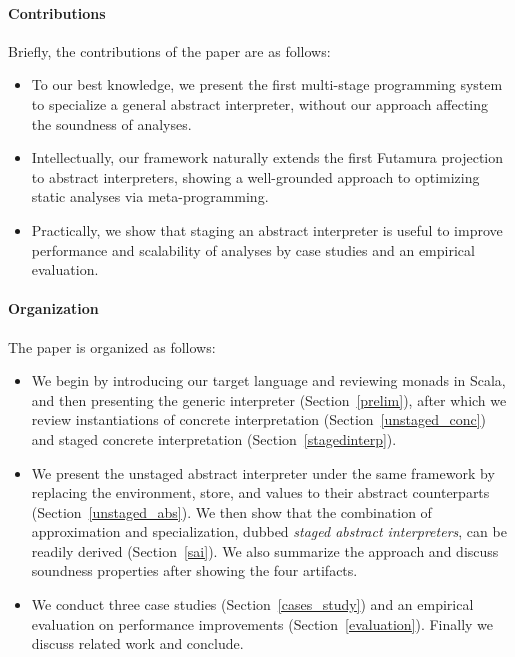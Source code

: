 \paragraph{Contributions} Briefly, the contributions of the paper are as follows:
\begin{itemize}[leftmargin=2em]
  \item To our best knowledge, we present the first
    multi-stage programming system to specialize a general abstract interpreter,
    without our approach affecting the soundness of analyses.
  \item Intellectually, our framework naturally extends the first
    Futamura projection to abstract interpreters, showing a
    well-grounded approach to optimizing static analyses via
    meta-programming.
  \item Practically, we show that staging an abstract interpreter is
    useful to improve performance and scalability of analyses by case
    studies and an empirical evaluation.
\end{itemize}

\paragraph{Organization} The paper is organized as follows:
\begin{itemize}[leftmargin=2em]
  \item We begin by introducing our target language and reviewing
    monads in Scala, and then presenting the generic interpreter
    (Section~\ref{prelim}), after which we review instantiations
    of concrete interpretation (Section~\ref{unstaged_conc}) and
    staged concrete interpretation (Section~\ref{stagedinterp}).
  \item We present the unstaged abstract interpreter under the same
    framework by replacing the environment, store, and values to their
    abstract counterparts (Section~\ref{unstaged_abs}). We then
    show that the combination of approximation and specialization, dubbed
    \textit{staged abstract interpreters}, can be readily derived
    (Section~\ref{sai}). We also summarize the approach and discuss
    soundness properties after showing the four artifacts.
  \item We conduct three case studies (Section~\ref{cases_study}) and
    an empirical evaluation on performance improvements (Section~\ref{evaluation}).
    Finally we discuss related work and conclude.
\end{itemize}

\iffalse
On the other side, static analysis is a trade-off between performance and
precision: higher precision usually leads to longer running time.

4. Existing method to improve the performance is adhoc, engineering heavy, require to rewrite the optimized version, therefore harder to reason about the correctness
6. program analyzers are also meta-programs, they manipulate other programs as data objects
\fi

